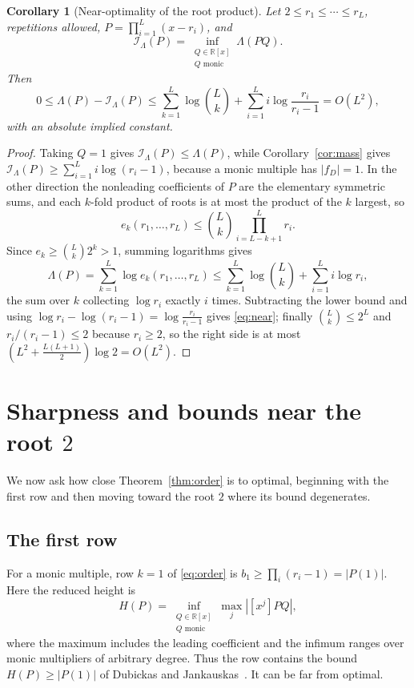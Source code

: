 \documentclass[11pt]{article}
\newtheorem{corollary}[theorem]{Corollary}
\newcommand{\R}{\mathbb R}
\begin{document}
\begin{corollary}[Near-optimality of the root product]\label{cor:near}
Let $2\le r_1\le\cdots\le r_L$, repetitions allowed,
$P=\prod_{i=1}^L(x-r_i)$, and
\[
  \mathcal I_\Lambda(P)=\inf_{\substack{Q\in\R[x]\\ Q\text{ monic}}}\Lambda(PQ).
\]
Then
\begin{equation}\label{eq:near}
  0\le\Lambda(P)-\mathcal I_\Lambda(P)
  \le\sum_{k=1}^L\log\binom Lk
    +\sum_{i=1}^L i\log\frac{r_i}{r_i-1}
  =O(L^2),
\end{equation}
with an absolute implied constant.
\end{corollary}

\begin{proof}
Taking $Q=1$ gives $\mathcal I_\Lambda(P)\le\Lambda(P)$, while
Corollary~\ref{cor:mass} gives
$\mathcal I_\Lambda(P)\ge\sum_{i=1}^L i\log(r_i-1)$, because a monic multiple
has $|f_D|=1$.
In the other direction the nonleading coefficients of $P$ are the elementary
symmetric sums, and each $k$-fold product of roots is at most the product of
the $k$ largest, so
\[
  e_k(r_1,\ldots,r_L)\le\binom Lk\prod_{i=L-k+1}^{L}r_i .
\]
Since $e_k\ge\binom Lk2^k>1$, summing logarithms gives
\[
  \Lambda(P)=\sum_{k=1}^L\log e_k(r_1,\ldots,r_L)
  \le\sum_{k=1}^L\log\binom Lk+\sum_{i=1}^L i\log r_i ,
\]
the sum over $k$ collecting $\log r_i$ exactly $i$ times.
Subtracting the lower bound and using
$\log r_i-\log(r_i-1)=\log\frac{r_i}{r_i-1}$ gives \eqref{eq:near}; finally
$\binom Lk\le2^L$ and $r_i/(r_i-1)\le2$ because $r_i\ge2$, so the right side
is at most $(L^2+\frac{L(L+1)}2)\log2=O(L^2)$.
\end{proof}

\section{Sharpness and bounds near the root \texorpdfstring{$2$}{2}}\label{sec:sharp}

We now ask how close Theorem~\ref{thm:order} is to optimal, beginning with
the first row and then moving toward the root $2$ where its bound degenerates.

\subsection{The first row}

For a monic multiple, row $k=1$ of \eqref{eq:order} is
$b_1\ge\prod_i(r_i-1)=|P(1)|$.  Here the reduced height is
\[
 H(P)=\inf_{\substack{Q\in\R[x]\\Q\text{ monic}}}
       \max_j|[x^j]P Q|,
\]
where the maximum includes the leading coefficient and the infimum ranges
over monic multipliers of arbitrary degree.  Thus the row contains the bound
$H(P)\ge|P(1)|$ of Dubickas and Jankauskas~\cite{dj}.  It can be far from
optimal.
\end{document}
